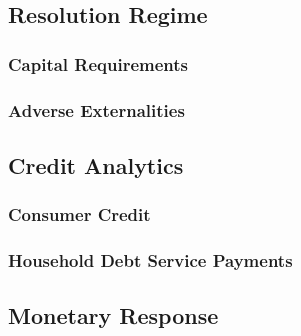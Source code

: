 
\subsection{Resolution Regime \label{sec:resolution}}
\subsubsection{Capital Requirements \label{sec:basel}}
\subsubsection{Adverse Externalities \label{sec:adverse}}


\subsection{Credit Analytics \label{sec:creditAnalytics}}
\subsubsection{Consumer Credit \label{sec:consumerCredit}}
\subsubsection{Household Debt Service Payments \label{sec:consumerDebt}}

\subsection{Monetary Response \label{sec:monetaryResponse}}

